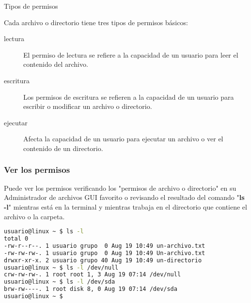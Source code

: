 \begin{frame}[c]{Tipos de permisos}

  Cada archivo o directorio tiene tres tipos de permisos básicos:

  \vspace{\baselineskip}
  \begin{description}
    \item [lectura] El permiso de lectura se refiere a la capacidad de un
      usuario para leer el contenido del archivo.
    \pausa
    \item [escritura] Los permisos de escritura se refieren a la capacidad
      de un usuario para escribir o modificar un archivo o directorio.
    \pausa
    \item [ejecutar] Afecta la capacidad de un usuario
      para ejecutar un archivo o ver el contenido de un directorio.
  \end{description}
\end{frame}

\begin{frame}[fragile]
  \frametitle{Ver los permisos}

  Puede ver los permisos verificando los "permisos de archivo o directorio"
  en su Administrador de archivos GUI favorito o revisando el resultado del
  comando "\textbf{ls -l}" mientras está en la terminal y mientras trabaja
  en el directorio que contiene el archivo o la carpeta.

  \begin{lstlisting}[language=Bash]
usuario@linux ~ $ ls -l
total 0
-rw-r--r--. 1 usuario grupo  0 Aug 19 10:49 un-archivo.txt
-rw-rw-rw-. 1 usuario grupo  0 Aug 19 10:49 Un-archivo.txt
drwxr-xr-x. 2 usuario grupo 40 Aug 19 10:49 un-directorio
usuario@linux ~ $ ls -l /dev/null
crw-rw-rw-. 1 root root 1, 3 Aug 19 07:14 /dev/null
usuario@linux ~ $ ls -l /dev/sda
brw-rw----. 1 root disk 8, 0 Aug 19 07:14 /dev/sda
usuario@linux ~ $
  \end{lstlisting}
\end{frame}

